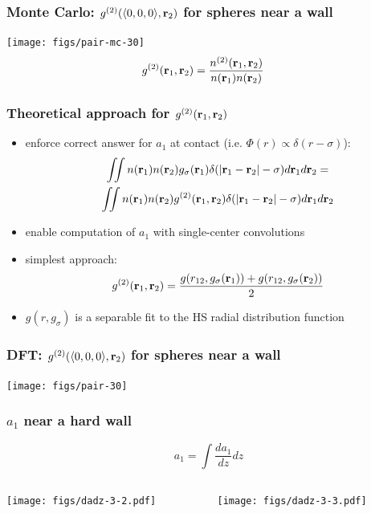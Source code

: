 \begin{frame}
  \frametitle{Monte Carlo: $g^{(2)}(\langle 0,0,0\rangle,\mathbf{r}_2)$ for spheres near a wall}
  \texttt{[image: figs/pair-mc-30]}
  \begin{align*}
    g^{(2)}(\mathbf{r}_1,\mathbf{r}_2) &= \frac{n^{(2)}(\mathbf{r}_1,\mathbf{r}_2)}{n(\mathbf{r}_1)n(\mathbf{r}_2)}
  \end{align*}
\end{frame}

\begin{frame}
  \frametitle{Theoretical approach for $g^{(2)}(\mathbf{r}_1,\mathbf{r}_2)$}
  \begin{block}{}
    \begin{itemize}
    \item enforce correct answer for $a_1$ at contact (i.e. $\Phi(r)
      \propto \delta(r-\sigma)$):
      \begin{multline*}
        \iint n(\mathbf{r}_1) n(\mathbf{r}_2) g_\sigma(\mathbf{r}_1)
        \delta(|\mathbf{r}_1-\mathbf{r}_2|-\sigma)
        d\mathbf{r}_1 d\mathbf{r}_2
        =\\
        \iint n(\mathbf{r}_1) n(\mathbf{r}_2) g^{(2)}(\mathbf{r}_1, \mathbf{r}_2)
        \delta(|\mathbf{r}_1-\mathbf{r}_2|-\sigma)
        d\mathbf{r}_1 d\mathbf{r}_2
      \end{multline*}
    \item enable computation of $a_1$ with single-center convolutions
    \item simplest approach:
      \begin{equation*}
        g^{(2)}(\mathbf{r}_1,\mathbf{r}_2) = \frac{g(r_{12}, g_\sigma(\mathbf{r}_1)) +
          g(r_{12}, g_\sigma(\mathbf{r}_2))}{2}
      \end{equation*}
    \item $g(r,g_\sigma)$ is a separable fit to the HS radial
      distribution function
    \end{itemize}
  \end{block}
\end{frame}

\begin{frame}
  \frametitle{DFT: $g^{(2)}(\langle 0,0,0\rangle,\mathbf{r}_2)$ for spheres near a wall}
  \texttt{[image: figs/pair-30]}
\end{frame}

\begin{frame}
  \frametitle{$a_1$ near a hard wall}
  \[ a_1 = \int \frac{da_1}{dz} dz \]
  \vspace{-3em}
  \begin{columns}
    \begin{column}{0.5\columnwidth}
      \begin{center}
        \texttt{[image: figs/dadz-3-2.pdf]}
      \end{center}
    \end{column}
    \begin{column}{0.5\columnwidth}
      \begin{center}
        \texttt{[image: figs/dadz-3-3.pdf]}
      \end{center}
    \end{column}
  \end{columns}
\end{frame}

